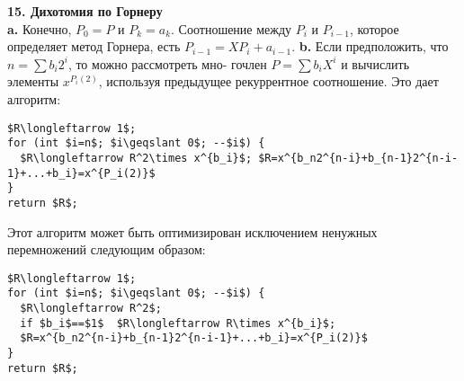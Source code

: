\noindent\textbf{15. Дихотомия по Горнеру}\\

\hspace*{15pt}\textbf{a.} Конечно, $P_0=P$ и $P_k=a_k$. Соотношение между $P_i$ и $P_{i-1}$,\linebreak
которое определяет метод Горнера, есть $P_{i-1}=X P_i+a_{i-1}$.\newline
\hspace*{15pt}\textbf{b.} Если предположить, что $n=\sum b_i2^i$, то можно рассмотреть мно-\linebreak
гочлен $P=\sum b_iX^i$ и вычислить элементы $x^{P_i(2)}$, используя предыдущее\linebreak
рекуррентное соотношение. Это дает алгоритм:
\begin{lstlisting}[xleftmargin=15pt, mathescape=true]
$R\longleftarrow 1$;
for (int $i=n$; $i\geqslant 0$; --$i$) {
  $R\longleftarrow R^2\times x^{b_i}$; $R=x^{b_n2^{n-i}+b_{n-1}2^{n-i-1}+...+b_i}=x^{P_i(2)}$
}
return $R$;
\end{lstlisting}
Этот алгоритм может быть оптимизирован исключением ненужных\linebreak
перемножений следующим образом:
\begin{lstlisting}[xleftmargin=15pt, mathescape=true]
$R\longleftarrow 1$;
for (int $i=n$; $i\geqslant 0$; --$i$) {
  $R\longleftarrow R^2$;
  if $b_i$==$1$  $R\longleftarrow R\times x^{b_i}$;
  $R=x^{b_n2^{n-i}+b_{n-1}2^{n-i-1}+...+b_i}=x^{P_i(2)}$
}
return $R$;
\end{lstlisting}


